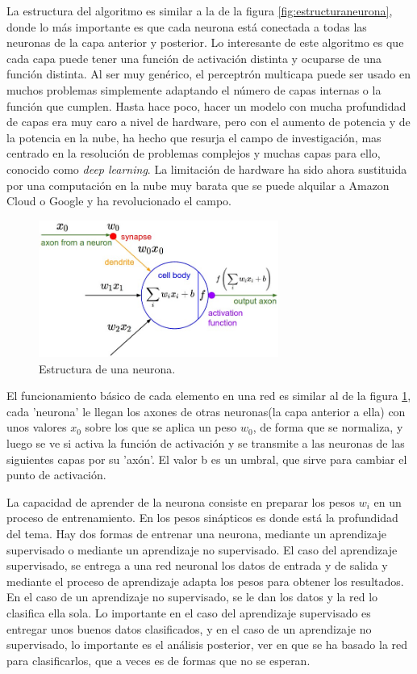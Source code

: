 \documentclass[12pt]{article}
\numberwithin{equation}{section}
\begin{document}
{La estructura del algoritmo es similar a la de la figura \ref{fig:estructuraneurona}, donde lo más importante es que cada neurona está conectada a todas las neuronas de la capa anterior y posterior. Lo interesante de este algoritmo es que cada capa puede tener una función de activación distinta y ocuparse de una función distinta. Al ser muy genérico, el perceptrón multicapa puede ser usado en muchos problemas simplemente adaptando el número de capas internas o la función que cumplen. Hasta hace poco, hacer un modelo con mucha profundidad de capas era muy caro a nivel de hardware, pero con el aumento de potencia y de la potencia en la nube, ha hecho que resurja el campo de investigación, mas centrado en la resolución de problemas complejos y muchas capas para ello, conocido como \textit{deep learning}. La limitación de hardware ha sido ahora sustituida por una computación en la nube muy barata que se puede alquilar a Amazon Cloud o Google y ha revolucionado el campo.

\begin{figure}[h]
    \centering
    \includegraphics[width=0.7\textwidth]{neuron.jpg}
    \caption{Estructura de una neurona.}
    \label{fig:estructura}
\end{figure}

El funcionamiento básico de cada elemento en una red es similar al de la figura \ref{fig:estructura}, cada 'neurona' le llegan los axones de otras neuronas(la capa anterior a ella) con unos valores $x_0$ sobre los que se aplica un peso $w_0$, de forma que se normaliza, y luego se ve si activa la función de activación y se transmite a las neuronas de las siguientes capas por su 'axón'. El valor b es un umbral, que sirve para cambiar el punto de activación.

La capacidad de aprender de la neurona consiste en preparar los pesos $w_i$ en un proceso de entrenamiento. En los pesos sinápticos es donde está la profundidad del tema. Hay dos formas de entrenar una neurona, mediante un aprendizaje supervisado o mediante un aprendizaje no supervisado. El caso del aprendizaje supervisado, se entrega a una red neuronal los datos de entrada y de salida y mediante el proceso de aprendizaje adapta los pesos para obtener los resultados. En el caso de un aprendizaje no supervisado, se le dan los datos y la red lo clasifica ella sola. Lo importante en el caso del aprendizaje supervisado es entregar unos buenos datos clasificados, y en el caso de un aprendizaje no supervisado, lo importante es el análisis posterior, ver en que se ha basado la red para clasificarlos, que a veces es de formas que no se esperan.

}
\end{document}

